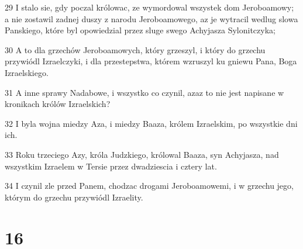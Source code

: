 \par 29 I stalo sie, gdy poczal królowac, ze wymordowal wszystek dom Jeroboamowy; a nie zostawil zadnej duszy z narodu Jeroboamowego, az je wytracil wedlug slowa Panskiego, które byl opowiedzial przez sluge swego Achyjasza Sylonitczyka;
\par 30 A to dla grzechów Jeroboamowych, który grzeszyl, i który do grzechu przywiódl Izraelczyki, i dla przestepstwa, którem wzruszyl ku gniewu Pana, Boga Izraelskiego.
\par 31 A inne sprawy Nadabowe, i wszystko co czynil, azaz to nie jest napisane w kronikach królów Izraelskich?
\par 32 I byla wojna miedzy Aza, i miedzy Baaza, królem Izraelskim, po wszystkie dni ich.
\par 33 Roku trzeciego Azy, króla Judzkiego, królowal Baaza, syn Achyjasza, nad wszystkim Izraelem w Tersie przez dwadziescia i cztery lat.
\par 34 I czynil zle przed Panem, chodzac drogami Jeroboamowemi, i w grzechu jego, którym do grzechu przywiódl Izraelity.

\chapter{16}

